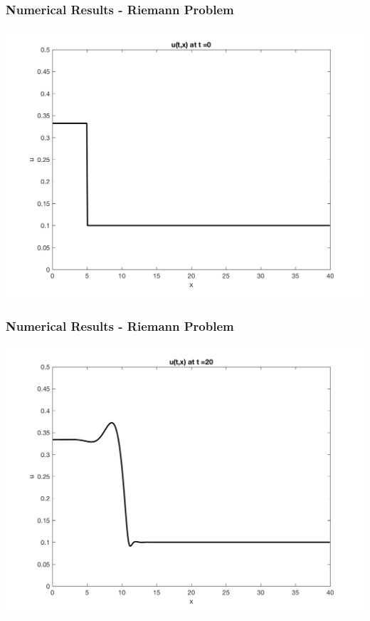 \documentclass[10pt]{beamer}
\begin{document}
    \begin{frame}
      \frametitle{Numerical Results - Riemann Problem}
      \begin{center}
        \includegraphics[scale=0.5]{Figures/reimann0.png}
      \end{center}
    \end{frame}
    \begin{frame}
      \frametitle{Numerical Results - Riemann Problem}
      \begin{center}
        \includegraphics[scale=0.5]{Figures/reimann20.png}
      \end{center}
    \end{frame}
\end{document}
